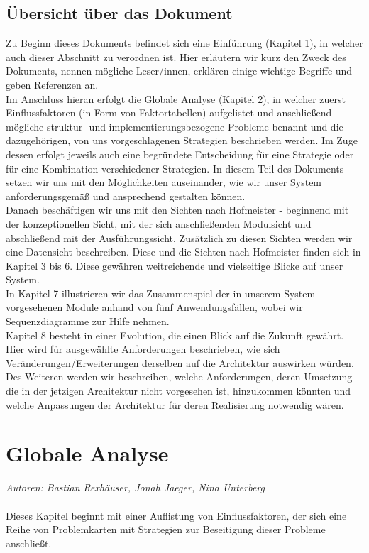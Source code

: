 \documentclass[enabledeprecatedfontcommands,fontsize=11pt,paper=a4,twoside]{scrartcl}
\newcounter{one}
\begin{document}
\subsection{Übersicht über das Dokument}
Zu Beginn dieses Dokuments befindet sich eine Einführung (Kapitel 1), in welcher auch dieser Abschnitt zu verordnen ist. Hier erläutern wir kurz den Zweck des Dokuments, nennen mögliche Leser/innen, erklären einige wichtige Begriffe und geben Referenzen an.  \\
Im Anschluss hieran erfolgt die Globale Analyse (Kapitel 2), in welcher zuerst Einflussfaktoren (in Form von Faktortabellen) aufgelistet und anschließend mögliche struktur- und implementierungsbezogene Probleme benannt und die dazugehörigen, von uns vorgeschlagenen Strategien beschrieben werden. Im Zuge dessen erfolgt jeweils auch eine begründete Entscheidung für eine Strategie oder für eine Kombination verschiedener Strategien. In diesem Teil des Dokuments setzen wir uns mit den Möglichkeiten auseinander, wie wir unser System anforderungsgemäß und ansprechend gestalten können. \\
Danach beschäftigen wir uns mit den Sichten nach Hofmeister - beginnend mit der konzeptionellen Sicht, mit der sich anschließenden Modulsicht und abschließend mit der Ausführungssicht. Zusätzlich zu diesen Sichten werden wir eine Datensicht beschreiben. Diese und die Sichten nach Hofmeister finden sich in Kapitel 3 bis 6. Diese gewähren weitreichende und vielseitige Blicke auf unser System. \\
In Kapitel 7 illustrieren wir das Zusammenspiel der in unserem System vorgesehenen Module anhand von fünf Anwendungsfällen, wobei wir Sequenzdiagramme zur Hilfe nehmen. \\
Kapitel 8 besteht in einer Evolution, die einen Blick auf die Zukunft gewährt. Hier wird für ausgewählte Anforderungen beschrieben, wie sich Veränderungen/Erweiterungen derselben auf die Architektur auswirken würden. Des Weiteren werden wir beschreiben, welche Anforderungen, deren Umsetzung die in der jetzigen Architektur nicht vorgesehen ist, hinzukommen könnten und welche Anpassungen der Architektur für deren Realisierung notwendig wären.


\newpage
\section{Globale Analyse}
\label{sec:globale_analyse}

\emph{Autoren: Bastian Rexhäuser, Jonah Jaeger, Nina Unterberg}\\ \\
Dieses Kapitel beginnt mit einer Auflistung von Einflussfaktoren, der sich eine Reihe von Problemkarten mit Strategien zur Beseitigung dieser Probleme anschließt.
\end{document}
